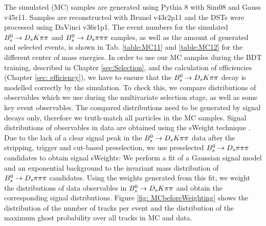 The simulated (MC) samples are generated using Pythia 8 with Sim08 and Gauss v45r11. Samples are reconstructed with Brunel v43r2p11 and the DSTs were processed using DaVinci v36r1p1. 
The event numbers for the simulated ${{B}^0_{s}}\rightarrow{\ensuremath{{D}_{s}}}{\ensuremath{K}}{\ensuremath{\pi}}{\ensuremath{\pi}}$ and ${{B}^0_{s}}\rightarrow{\ensuremath{{D}_{s}}}{\ensuremath{\pi}}{\ensuremath{\pi}}{\ensuremath{\pi}}$ samples, as well as the amount of generated and selected events, 
is shown in Tab. \ref{table:MC11} and \ref{table:MC12} for the different center of mass energies. \newline
In order to use our MC samples during the BDT training, described in Chapter \ref{sec:Selection}, and the calculation of efficiencies (Chapter \ref{sec: efficiency}), 
we have to ensure that the ${{B}^0_{s}}\rightarrow{\ensuremath{{D}_{s}}}{\ensuremath{K}}{\ensuremath{\pi}}{\ensuremath{\pi}}$ decay is modelled correctly by the simulation. 
To check this, we compare distributions of observables which we use during the multivariate selection stage, as well as some key event observables. 
The compared distributions need to be generated by signal decays only, therefore we truth-match all particles in the MC samples. 
Signal distributions of observables in data are obtained using the sWeight technique \cite{Pivk:2004ty}. 
Due to the lack of a clear signal peak in the ${{B}^0_{s}}\rightarrow{\ensuremath{{D}_{s}}}{\ensuremath{K}}{\ensuremath{\pi}}{\ensuremath{\pi}}$ data after the stripping, trigger and cut-based preselection, we use preselected ${{B}^0_{s}}\rightarrow{\ensuremath{{D}_{s}}}{\ensuremath{\pi}}{\ensuremath{\pi}}{\ensuremath{\pi}}$ candidates to obtain signal sWeights:  
We perform a fit of a Gaussian signal model and an exponential background to the invariant mass distribution of ${{B}^0_{s}}\rightarrow{\ensuremath{{D}_{s}}}{\ensuremath{\pi}}{\ensuremath{\pi}}{\ensuremath{\pi}}$ candidates. 
Using the weights generated from this fit, we weight the distributions of data observables in ${{B}^0_{s}}\rightarrow{\ensuremath{{D}_{s}}}{\ensuremath{K}}{\ensuremath{\pi}}{\ensuremath{\pi}}$ and obtain the corresponding signal distributions. \newline
Figure \ref{fig: MCbeforeWeighting} shows the distribution of the number of tracks per event and the distribution of the maximum ghost probability over all tracks in MC and data.

